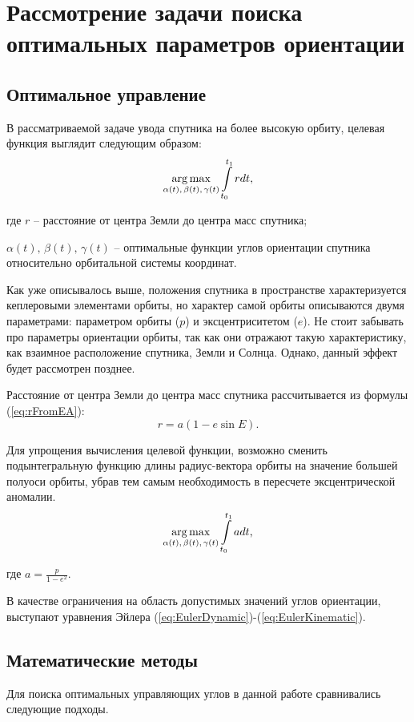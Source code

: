\chapter{Рассмотрение задачи поиска оптимальных параметров ориентации}
\section{Оптимальное управление}
\noindent\indent В рассматриваемой задаче увода спутника на более высокую орбиту,
целевая функция выглядит следующим образом:
\begin{equation} \label{eq:IntMaxFullEq}
  \operatorname*{arg\,max}\limits_{\alpha(t),\,\beta(t),\,\gamma(t)}\int\limits_{t_0}^{t_1} r dt,
\end{equation}\par
    где $r$ -- расстояние от центра Земли до центра масс спутника;\par
    $\alpha(t),\,\beta(t),\,\gamma(t)$ -- оптимальные функции углов ориентации
спутника относительно орбитальной системы координат.\par
    Как уже описывалось выше, положения спутника в пространстве характеризуется
кеплеровыми элементами орбиты, но характер самой орбиты описываются двумя параметрами:
параметром орбиты ($p$) и эксцентриситетом ($e$). Не стоит забывать про параметры ориентации
орбиты, так как они отражают такую характеристику, как взаимное расположение спутника,
Земли и Солнца. Однако, данный эффект будет рассмотрен позднее.\par
    Расстояние от центра Земли до центра масс спутника рассчитывается из формулы
(\ref{eq:rFromEA}):
\begin{equation}
    r = a(1 - e\sin E).
\end{equation}\par
    Для упрощения вычисления целевой функции, возможно сменить подынтегральную
функцию длины радиус-вектора орбиты на значение большей полуоси орбиты,
убрав тем самым необходимость в пересчете эксцентрической аномалии.
\begin{equation} \label{eq:IntMaxFullEq}
  \operatorname*{arg\,max}\limits_{\alpha(t),\,\beta(t),\,\gamma(t)}\int\limits_{t_0}^{t_1} a dt,
\end{equation}\par
где $a = \frac{p}{1 - e^2}$.\par
    В качестве ограничения на область допустимых значений углов ориентации, выступают
уравнения Эйлера (\ref{eq:EulerDynamic})-(\ref{eq:EulerKinematic}).
\section{Математические методы}
\noindent\indent Для поиска оптимальных управляющих углов в данной работе сравнивались
следующие подходы.
